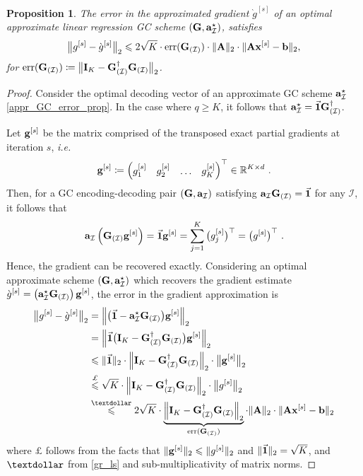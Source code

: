 \documentclass[journal,letterpaper,onecolumn,twoside,nofonttune]{IEEEtran}
\newcommand{\R}{\mathbb{R}}
\newcommand{\I}{\mathcal{I}}
\newcommand{\ab}{\bold{a}}
\newcommand{\bb}{\bold{b}}
\newcommand{\gb}{\bold{g}}
\newcommand{\xb}{\bold{x}}
\newcommand{\Ab}{\bold{A}}
\newcommand{\Gb}{\bold{G}}
\newcommand{\Ib}{\bold{I}}
\newcommand{\err}{\mathrm{err}}
\newtheorem{Prop}{Proposition}
\begin{document}
\begin{Prop}
\label{prop_opt_dec_err}
The error in the approximated gradient $\grave{g}^{[s]}$ of an optimal approximate linear regression GC scheme $(\Gb,\ab_\I^\star)$, satisfies
\begin{equation}
\label{appr_GC_error_prop} %
  \big\|g^{[s]}-\grave{g}^{[s]}\big\|_2 \leqslant 2\sqrt{K}\cdot\err(\Gb_{(\I)})\cdot\|\Ab\|_2\cdot\|\Ab\xb^{[s]}-\bb\|_2,
\end{equation}
for $\err(\Gb_{(\I)}) \coloneqq \big\|\Ib_K-\Gb_{(\I)}^{\dagger}\Gb_{(\I)}\big\|_2$.
\end{Prop}

\begin{proof}
Consider the optimal decoding vector of an approximate GC scheme $\ab_\I^\star$ \eqref{appr_GC_error_prop}. In the case where $q\geqslant K$, it follows that $\ab_\I^\star = \vec{\bold{1}}\Gb_{(\I)}^{\dagger}$.

Let $\gb^{[s]}$ be the matrix comprised of the transposed exact partial gradients at iteration $s$, \textit{i.e.}
\begin{equation*}
  \gb^{[s]} \coloneqq {\begin{pmatrix} g_1^{[s]} & g_2^{[s]} & \hdots & g_K^{[s]} \end{pmatrix}}^\top \in \R^{K\times d}\ .
\end{equation*}
Then, for a GC encoding-decoding pair $(\Gb,\ab_\I)$ satisfying $\ab_\I\Gb_{(\I)}=\vec{\bold{1}}$ for any $\I$, it follows that
$$ \ab_\I\left(\Gb_{(\I)}\gb^{[s]}\right) = \vec{\bold{1}}\gb^{[s]} = \sum_{j=1}^K\big(g_j^{[s]}\big)^\top = \big(g^{[s]}\big)^\top \ . $$
Hence, the gradient can be recovered exactly. Considering an optimal approximate scheme $(\Gb,\ab_\I^\star)$ which recovers the gradient estimate $\grave{g}^{[s]}=\left(\ab_\I^\star\Gb_{(\I)}\right)\gb^{[s]}$, the error in the gradient approximation is
\begin{align*}
  \big\|g^{[s]}-\grave{g}^{[s]}\big\|_2 &= \left\|\big(\vec{\bold{1}}-\ab_\I^\star\Gb_{(\I)}\big)\gb^{[s]}\right\|_2\\
  &= \left\|\vec{\bold{1}}\big(\Ib_K-\Gb_{(\I)}^{\dagger}\Gb_{(\I)}\big)\gb^{[s]}\right\|_2\\
  &\leqslant \|\vec{\bold{1}}\|_2\cdot \left\|\Ib_K-\Gb_{(\I)}^{\dagger}\Gb_{(\I)}\right\|_2\cdot\big\|\gb^{[s]}\big\|_2\\
  &\overset{\pounds}{\leqslant} \sqrt{K}\cdot \left\|\Ib_K-\Gb_{(\I)}^{\dagger}\Gb_{(\I)}\right\|_2\cdot\big\|g^{[s]}\big\|_2\\
  &\overset{\textdollar}{\leqslant} 2\sqrt{K}\cdot\underbrace{\left\|\Ib_K-\Gb_{(\I)}^{\dagger}\Gb_{(\I)}\right\|_2}_{\err(\Gb_{(\I)})}\cdot\|\Ab\|_2\cdot\|\Ab\xb^{[s]}-\bb\|_2
\end{align*}
where $\pounds$ follows from the facts that $\|\gb^{[s]}\|_2\leqslant\|g^{[s]}\|_2$ and $\|\vec{\bold{1}}\|_2=\sqrt{K}$, and $\textdollar$ from \eqref{gr_ls} and sub-multiplicativity of matrix norms.
\end{proof}
\end{document}
